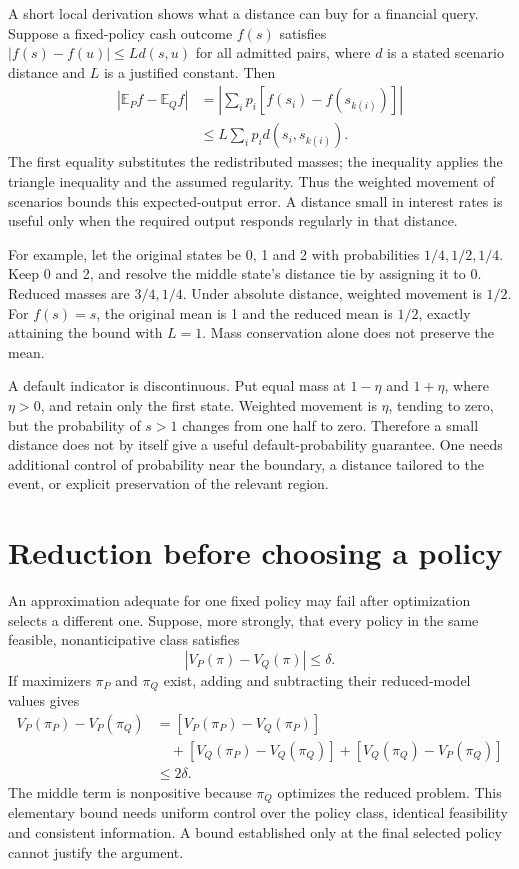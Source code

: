 A short local derivation shows what a distance can buy for a financial query. Suppose a fixed-policy cash outcome $f(s)$ satisfies $|f(s)-f(u)|\leq Ld(s,u)$ for all admitted pairs, where $d$ is a stated scenario distance and $L$ is a justified constant. Then
\begin{align}
 |\mathbb E_P f-\mathbb E_Q f|
 &=\left|\sum_i p_i[f(s_i)-f(s_{k(i)})]\right|\nonumber\\
 &\leq L\sum_i p_i d(s_i,s_{k(i)}).
\end{align}
The first equality substitutes the redistributed masses; the inequality applies the triangle inequality and the assumed regularity. Thus the weighted movement of scenarios bounds this expected-output error. A distance small in interest rates is useful only when the required output responds regularly in that distance.

For example, let the original states be 0, 1 and 2 with probabilities $1/4,1/2,1/4$. Keep 0 and 2, and resolve the middle state's distance tie by assigning it to 0. Reduced masses are $3/4,1/4$. Under absolute distance, weighted movement is $1/2$. For $f(s)=s$, the original mean is 1 and the reduced mean is $1/2$, exactly attaining the bound with $L=1$. Mass conservation alone does not preserve the mean.

A default indicator is discontinuous. Put equal mass at $1-\eta$ and $1+\eta$, where $\eta>0$, and retain only the first state. Weighted movement is $\eta$, tending to zero, but the probability of $s>1$ changes from one half to zero. Therefore a small distance does not by itself give a useful default-probability guarantee. One needs additional control of probability near the boundary, a distance tailored to the event, or explicit preservation of the relevant region.

\section{Reduction before choosing a policy}
An approximation adequate for one fixed policy may fail after optimization selects a different one. Suppose, more strongly, that every policy in the same feasible, nonanticipative class satisfies
\begin{equation}
 |V_P(\pi)-V_Q(\pi)|\leq\delta.
\end{equation}
If maximizers $\pi_P$ and $\pi_Q$ exist, adding and subtracting their reduced-model values gives
\begin{align}
 V_P(\pi_P)-V_P(\pi_Q)
 &= [V_P(\pi_P)-V_Q(\pi_P)]\nonumber\\
 &\quad+[V_Q(\pi_P)-V_Q(\pi_Q)]
       +[V_Q(\pi_Q)-V_P(\pi_Q)]\nonumber\\
 &\leq2\delta.
\end{align}
The middle term is nonpositive because $\pi_Q$ optimizes the reduced problem. This elementary bound needs uniform control over the policy class, identical feasibility and consistent information. A bound established only at the final selected policy cannot justify the argument.


